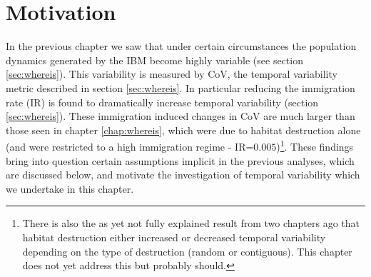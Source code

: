 


\section{Motivation}
\label{sec:motivate_stationarity}

In the previous chapter we saw that under certain circumstances the population dynamics generated by the IBM become highly variable (see section \ref{sec:whereis}). This variability is measured by CoV, the temporal variability metric described in section \ref{sec:whereis}. In particular reducing the immigration rate (IR) is found to dramatically increase temporal variability (section \ref{sec:whereis}). These immigration induced changes in CoV are much larger than those seen in chapter \ref{chap:whereis}, which were due to habitat destruction alone (and were restricted to a high immigration regime - IR=$0.005$)\footnote{There is also the as yet not fully explained result from two chapters ago that habitat destruction either increased or decreased temporal variability depending on the type of destruction (random or contiguous). This chapter does not yet address this but probably should.}. These findings bring into question certain assumptions implicit in the previous analyses, which are discussed below, and motivate the investigation of temporal variability which we undertake in this chapter. 

